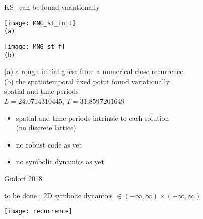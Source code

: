 \begin{frame}{KS \twots\ can be found variationally}
\begin{minipage}[height=.32\textheight]{.45\textwidth}
\centering
\texttt{[image: MNG\_st\_init]}
\\  \small{\texttt{(a)}}
\end{minipage}
\begin{minipage}[height=.32\textheight]{.45\textwidth}
\centering
\texttt{[image: MNG\_st\_f]}
\\\small{\texttt{(b)}}
\end{minipage}

\medskip
(a) a rough initial guess from a numerical close recurrence\\
(b) the spatiotemporal fixed point found variationally\\
 spatial and time periods \\
 $L=24.0714310445$, $T=31.8597201649$


\begin{itemize}
\item spatial and time periods intrinsic to each solution \\ (no discrete lattice)
\item no robust code as yet
\item no symbolic dynamics as yet
\end{itemize}
\vfill\hfill        Gudorf 2018
\end{frame}


\begin{frame}{
to be done : 2D symbolic dynamics
$\in (-\infty, \infty)\times (-\infty, \infty)$
             }
\begin{center}
\texttt{[image: recurrence]}
\end{center}

\end{frame}


%
%

